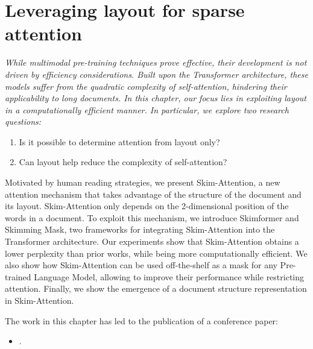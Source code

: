 
\chapter{Leveraging layout for sparse attention}
\label{chapter:skim-attention}

\renewcommand{\leftmark}{\spacedlowsmallcaps{Leveraging layout for sparse attention}}

\begin{chapabstract}
	{\em    
        While multimodal pre-training techniques prove effective, their development is not driven by efficiency considerations. Built upon the Transformer architecture, these models suffer from the quadratic complexity of self-attention, hindering their applicability to long documents. In this chapter, our focus lies in exploiting layout in a computationally efficient manner. In particular, we explore two research questions: 
        \begin{enumerate}
            \item Is it possible to determine attention from layout only? 
            \item Can layout help reduce the complexity of self-attention? 
        \end{enumerate}
        Motivated by human reading strategies, we present Skim-Attention, a new attention mechanism that takes advantage of the structure of the document and its layout. Skim-Attention only depends on the 2-dimensional position of the words in a document. To exploit this mechanism, we introduce Skimformer and Skimming Mask, two frameworks for integrating Skim-Attention into the Transformer architecture. Our experiments show that Skim-Attention obtains a lower perplexity than prior works, while being more computationally efficient. We also show how Skim-Attention can be used off-the-shelf as a mask for any Pre-trained Language Model, allowing to improve their performance while restricting attention. Finally, we show the emergence of a document structure representation in Skim-Attention.     
	\vspace*{5mm}
	
	The work in this chapter has led to the publication of a conference paper:}
	\begin{itemize}
		\item \small {}.
	\end{itemize}
\end{chapabstract}



